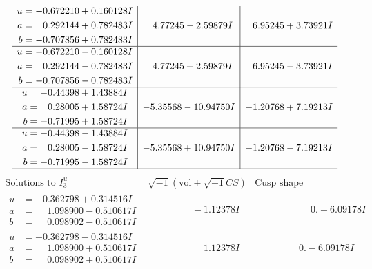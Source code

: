 \documentclass[1p]{elsarticle_modified}
\theoremstyle{definition}
\newcommand{\I}{\sqrt{-1}}
\begin{document}
$$\begin{array}{c|c|c}
\begin{aligned}
u &= -0.672210 + 0.160128 I \\
a &= \phantom{-}0.292144 + 0.782483 I \\
b &= -0.707856 + 0.782483 I\end{aligned}
 & \phantom{-}4.77245 - 2.59879 I & \phantom{-}6.95245 + 3.73921 I \\ \hline\begin{aligned}
u &= -0.672210 - 0.160128 I \\
a &= \phantom{-}0.292144 - 0.782483 I \\
b &= -0.707856 - 0.782483 I\end{aligned}
 & \phantom{-}4.77245 + 2.59879 I & \phantom{-}6.95245 - 3.73921 I \\ \hline\begin{aligned}
u &= -0.44398 + 1.43884 I \\
a &= \phantom{-}0.28005 + 1.58724 I \\
b &= -0.71995 + 1.58724 I\end{aligned}
 & -5.35568 - 10.94750 I & -1.20768 + 7.19213 I \\ \hline\begin{aligned}
u &= -0.44398 - 1.43884 I \\
a &= \phantom{-}0.28005 - 1.58724 I \\
b &= -0.71995 - 1.58724 I\end{aligned}
 & -5.35568 + 10.94750 I & -1.20768 - 7.19213 I\\
 \hline 
 \end{array}$$\newpage$$\begin{array}{c|c|c}  
\text{Solutions to }I^u_{3}& \I (\text{vol} + \sqrt{-1}CS) & \text{Cusp shape}\\
 \hline 
\begin{aligned}
u &= -0.362798 + 0.314516 I \\
a &= \phantom{-}1.098900 - 0.510617 I \\
b &= \phantom{-}0.098902 - 0.510617 I\end{aligned}
 & \phantom{-0.000000 } -1.12378 I & \phantom{-0.000000 -}0. + 6.09178 I \\ \hline\begin{aligned}
u &= -0.362798 - 0.314516 I \\
a &= \phantom{-}1.098900 + 0.510617 I \\
b &= \phantom{-}0.098902 + 0.510617 I\end{aligned}
 & \phantom{-0.000000 -}1.12378 I & \phantom{-0.000000 } 0. - 6.09178 I \\ \hline\begin{aligned}

\end{aligned}
\end{array}$$
\end{document}
